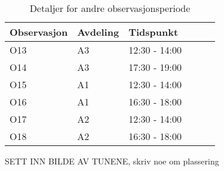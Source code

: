 \begin{table}[H]\centering
    \begin{tabular}{ |l|l|l|l|l|l| }
    \hline
    Observasjon & Avdeling & Tidspunkt \\ \hline
       O13 & A3 & 12:30 - 14:00 \\ \hline
       O14 & A3 & 17:30 - 19:00 \\ \hline
      O15 & A1 & 12:30 - 14:00 \\ \hline
       O16 & A1 & 16:30 - 18:00 \\ \hline
         O17 & A2 & 12:30 - 14:00 \\ \hline
       O18 & A2 & 16:30 - 18:00 \\ \hline
    \end{tabular}
    \caption {Detaljer for andre observasjonsperiode}
    \label{detaljer2}
\end{table}
 
\noindent
SETT INN BILDE AV TUNENE, skriv noe om plassering


 